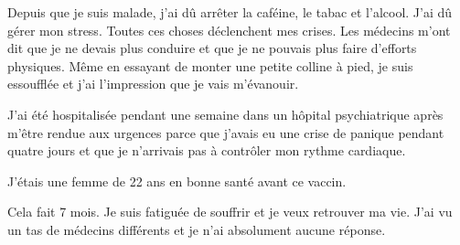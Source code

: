 Depuis que je suis malade, j'ai dû arrêter la caféine, le tabac et
l'alcool. J'ai dû gérer mon stress. Toutes ces choses déclenchent mes
crises. Les médecins m'ont dit que je ne devais plus conduire et que je ne
pouvais plus faire d'efforts physiques. Même en essayant de monter une petite
colline à pied, je suis essoufflée et j'ai l'impression que je vais m'évanouir.

J'ai été hospitalisée pendant une semaine dans un hôpital psychiatrique après
m'être rendue aux urgences parce que j'avais eu une crise de panique pendant
quatre jours et que je n'arrivais pas à contrôler mon rythme cardiaque.

J'étais une femme de 22 ans en bonne santé avant ce vaccin.

Cela fait 7 mois. Je suis fatiguée de souffrir et je veux retrouver ma vie. J'ai
vu un tas de médecins différents et je n'ai absolument aucune réponse.
